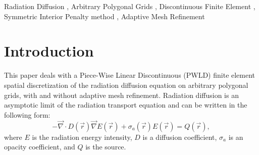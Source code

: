 \documentclass[preprint,10pt]{elsarticle}
\renewcommand{\div}{\vec{\nabla}\! \cdot \!}
\newcommand{\grad}{\vec{\nabla}}
\newcommand{\vr}{\vec{r}}
\newcommand{\tcr}[1]{\textcolor{red}{#1}}
\begin{document}
\begin{frontmatter}
\begin{abstract}
\end{abstract}

\begin{keyword}
  Radiation Diffusion \sep
	Arbitrary Polygonal Grids \sep
  Discontinuous Finite Element \sep
	Symmetric Interior Penalty method \sep
  Adaptive Mesh Refinement
\end{keyword}

\end{frontmatter}


\linenumbers

\section{Introduction} \label{sec:intro}


This paper deals with a Piece-Wise Linear Discontinuous (PWLD) finite element spatial discretization of 
the radiation diffusion equation on arbitrary polygonal grids, with and without adaptive mesh refinement. 
Radiation diffusion is an asymptotic limit of the radiation transport equation and can be 
written in the following form:
\begin{equation} \label{eq:radiation_diffusion}
- \div  D(\vr) \grad E(\vr) + \sigma_a(\vr) E(\vr) = Q(\vr) ,
\end{equation}
where $E$ is the radiation energy intensity, $D$ is a diffusion coefficient, $\sigma_a$ is 
an opacity coefficient, and $Q$ is the source.
\end{document}
